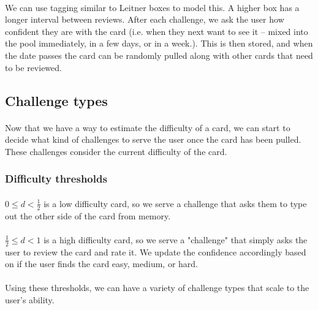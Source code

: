 \documentclass{report}
\begin{document}
\paragraph{}
We can use tagging similar to Leitner boxes to model this. A higher box has a longer interval between reviews.
After each challenge, we ask the user how confident they are with the card (i.e. when they next want to see it -- mixed into the pool immediately, in a few days, or in a week.). This is then stored, and when the date passes the card can be randomly pulled along with other cards that need to be reviewed.

\subsection{Challenge types}
\paragraph{}
Now that we have a way to estimate the difficulty of a card, we can start to decide what kind of challenges to serve the user once the card has been pulled. These challenges consider the current difficulty of the card.

\subsubsection{Difficulty thresholds}
\paragraph{}
$0 \leq d < \frac{1}{2}$ is a low difficulty card, so we serve a challenge that asks them to type out the other side of the card from memory.

\paragraph{}
$\frac{1}{2} \leq d < 1$ is a high difficulty card, so we serve a "challenge" that simply asks the user to review the card and rate it. We update the confidence accordingly based on if the user finds the card easy, medium, or hard.

\paragraph{}
Using these thresholds, we can have a variety of challenge types that scale to the user's ability.
\end{document}
